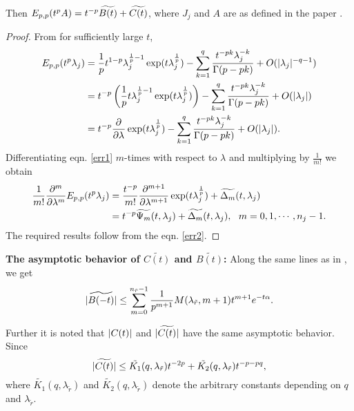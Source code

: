 Then $E_{p,p}(t^{p} A) = t^{-p} \widetilde{B(t)} + \widetilde{C(t)}$, where $J_j$ and $A$ are as defined in the paper \cite{deshpande2016local}.

	
	\begin{proof}
		From \citep[thm 1.3]{podlubny1999fractional} for sufficiently large $t$,
		\begin{align}
		\nonumber E_{p,p}(t^{p} \lambda_j) &= \frac{1}{p} t^{1-p} \lambda_j ^{\frac{1}{p}-1} \exp(t \lambda_j ^{\frac{1}{p}}) - \sum_{k=1}^{q} \frac{t^{-pk} \lambda_j ^{-k}}{\Gamma(p-pk)} + O(\lvert \lambda_j\rvert ^{-q-1}) \\
		\nonumber&= t^{-p} \left( \frac{1}{p} t \lambda_j ^{\frac{1}{p}-1} \exp(t \lambda_j ^{\frac{1}{p}})\right) - \sum_{k=1}^{q} \frac{t^{-pk} \lambda_j ^{-k}}{\Gamma(p-pk)} + O(\lvert \lambda_j\rvert) \\
		& = t^{-p} \dfrac{\partial^{ }}{\partial \lambda^{ }} \exp(t \lambda_j ^{\frac{1}{p}}) - \sum_{k=1}^{q} \frac{t^{-pk} \lambda_j ^{-k}}{\Gamma(p-pk)} + O(\lvert \lambda_j\rvert). \label{err1} 
		\end{align} 
		Differentiating eqn. \eqref{err1} $m$-times with respect to $\lambda$ and multiplying by $\frac{1}{m!}$ we obtain
		\begin{align}
		\nonumber\frac{1}{m!} \dfrac{\partial^{m}}{\partial \lambda^{m}} E_{p,p}(t^{p} \lambda_j) & = \frac{t^{-p}}{m!} \dfrac{\partial^{m+1}}{\partial \lambda^{m+1}} \exp(t \lambda_j ^{\frac{1}{p}}) + \widetilde{\Delta_m}(t,\lambda_j) \\
		&= t^{-p} \widetilde{\Psi_m}(t, \lambda_j) + \widetilde{\Delta_m}(t,\lambda_j), ~~m=0,1,\cdots,n_j-1. \label{err2}  
		\end{align}
		The required results follow from the eqn. \eqref{err2}.
	\end{proof}
	
	\textbf{The asymptotic behavior of $\widetilde{C(t)}$ and $\widetilde{B(t)}$:} Along the same lines as in \citep[Lemma 5]{deshpande2016local}, we get
	\begin{equation}
    \lvert \widetilde{B(-t)}\rvert \leq \sum_{m=0}^{n_{\tilde{r}}-1} \frac{1}{p^{m+1}} M(\lambda_{\tilde{r}},m+1) t^{m+1}  e^{-t \alpha}.  
	\end{equation}
	
	Further it is noted that $\lvert C(t)\rvert$ and $\lvert \widetilde{C(t)}\rvert$ have the same asymptotic behavior. Since 
	\begin{equation}
	\lvert \widetilde{C(t)}\rvert \leq \tilde{K_1}(q, \lambda_{\tilde{r}}) t^{-2p} + \tilde{K_2}(q, \lambda_{\tilde{r}}) t^{-p-pq},
	\end{equation}
	where $\tilde{K_1} (q, \lambda_{\tilde{r}})$ and $\tilde{K_2}(q, \lambda_{\tilde{r}})$ denote the arbitrary constants depending on $q$ and $\lambda_{\tilde{r}}$.
	

